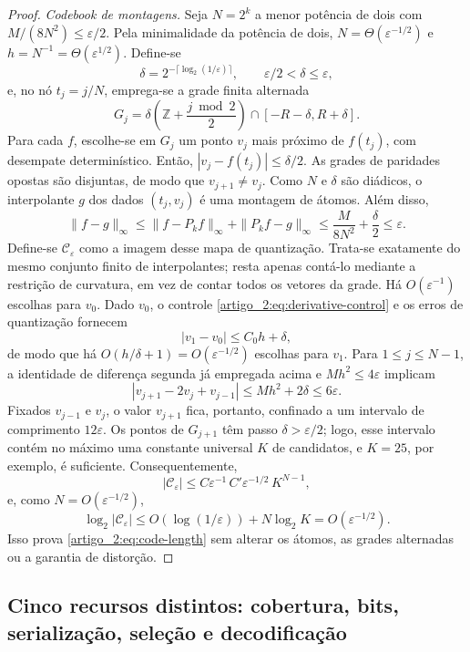 \begin{proof}
\emph{Codebook de montagens.} Seja $N=2^k$ a menor potência de dois com $M/(8N^2)\le\varepsilon/2$. Pela minimalidade da potência de dois, $N=\Theta(\varepsilon^{-1/2})$ e $h=N^{-1}=\Theta(\varepsilon^{1/2})$. Define-se
\[
 \delta=2^{-\lceil\log_2(1/\varepsilon)\rceil},
 \qquad \varepsilon/2<\delta\le\varepsilon,
\]
e, no nó $t_j=j/N$, emprega-se a grade finita alternada
\begin{equation}
 G_j=\delta\left(\mathbb{Z}+\frac{j\bmod2}{2}\right)
 \cap[-R-\delta,R+\delta].
 \label{artigo_2:eq:alternating-grid}
\end{equation}
Para cada $f$, escolhe-se em $G_j$ um ponto $v_j$ mais próximo de $f(t_j)$, com desempate determinístico. Então, $|v_j-f(t_j)|\le\delta/2$. As grades de paridades opostas são disjuntas, de modo que $v_{j+1}\neq v_j$. Como $N$ e $\delta$ são diádicos, o interpolante $g$ dos dados $(t_j,v_j)$ é uma montagem de átomos. Além disso,
\[
 \|f-g\|_\infty
 \le\|f-P_kf\|_\infty+\|P_kf-g\|_\infty
 \le\frac{M}{8N^2}+\frac\delta2\le\varepsilon.
\]
Define-se $\mathcal C_\varepsilon$ como a imagem desse mapa de quantização.
Trata-se exatamente do mesmo conjunto finito de interpolantes; resta apenas contá-lo
mediante a restrição de curvatura, em vez de contar todos os vetores da grade.
Há $O(\varepsilon^{-1})$ escolhas para $v_0$. Dado $v_0$, o controle
\eqref{artigo_2:eq:derivative-control} e os erros de quantização fornecem
\[
 |v_1-v_0|\le C_0h+\delta,
\]
de modo que há $O(h/\delta+1)=O(\varepsilon^{-1/2})$ escolhas para $v_1$.
Para $1\le j\le N-1$, a identidade de diferença segunda já empregada acima e
$Mh^2\le4\varepsilon$ implicam
\[
 |v_{j+1}-2v_j+v_{j-1}|
 \le Mh^2+2\delta\le6\varepsilon.
\]
Fixados $v_{j-1}$ e $v_j$, o valor $v_{j+1}$ fica, portanto, confinado a um
intervalo de comprimento $12\varepsilon$. Os pontos de $G_{j+1}$ têm passo
$\delta>\varepsilon/2$; logo, esse intervalo contém no máximo uma constante
universal $K$ de candidatos, e $K=25$, por exemplo, é suficiente. Consequentemente,
\[
 |\mathcal C_\varepsilon|
 \le C\varepsilon^{-1}\,C'\varepsilon^{-1/2}\,K^{N-1},
\]
e, como $N=O(\varepsilon^{-1/2})$,
\[
 \log_2|\mathcal C_\varepsilon|
 \le O(\log(1/\varepsilon))+N\log_2K
 =O(\varepsilon^{-1/2}).
\]
Isso prova \eqref{artigo_2:eq:code-length} sem alterar os átomos, as grades alternadas
ou a garantia de distorção.
\end{proof}

\subsection{Cinco recursos distintos: cobertura, bits, serialização, seleção e decodificação}

